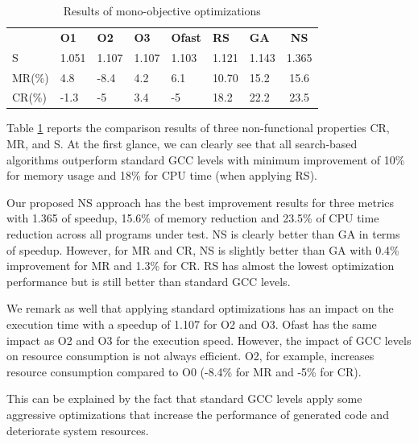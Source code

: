 \begin{table}[h]
	\centering
	\caption{Results of mono-objective optimizations}
	\label{my-label}
	\begin{tabular}{|l|l|l|l|l|l|l|c|}
		\hline
		& \textbf{O1}                    & \textbf{O2}                    & \textbf{O3}                    & \textbf{Ofast}                 & \textbf{RS}                    & \textbf{GA}                    & 
		\textbf{NS} \\
		\hhline{|=|=|=|=|=|=|=|=|}
		S  &  1.051 & 1.107  & 1.107  & 1.103  & 1.121  &  1.143 &  1.365  \\ \hline
		MR(\%) & 4.8  & -8.4  &  4.2 & 6.1  &  10.70 & 15.2  &  15.6  \\ \hline
		CR(\%) & -1.3  & -5  & 3.4  & -5  &  18.2 & 22.2  &  23.5  \\ \hline
	\end{tabular}
	\label{tab:Results of mono-objective optimizations}
\end{table}

Table \ref{tab:Results of mono-objective optimizations} reports the comparison results of three non-functional properties CR, MR, and S. At the first glance, we can clearly see that all search-based algorithms outperform standard GCC levels with minimum improvement of 10\% for memory usage and 18\% for CPU time (when applying RS).
 
Our proposed NS approach has the best improvement results for three metrics with 1.365 of speedup, 15.6\% of memory reduction and 23.5\% of CPU time reduction across all programs under test. NS is clearly better than GA in terms of speedup. However, for MR and CR, NS is slightly better than GA with 0.4\% improvement for MR and 1.3\% for CR. RS has almost the lowest optimization performance but is still better than standard GCC levels.

We remark as well that applying standard optimizations has an impact on the execution time with a speedup of 1.107 for O2 and O3. Ofast has the same impact as O2 and O3 for the execution speed. However, the impact of GCC levels on resource consumption is not always efficient. O2, for example, increases resource consumption compared to O0 (-8.4\% for MR and -5\% for CR). 

This can be explained by the fact that standard GCC levels apply some aggressive optimizations that increase the performance of generated code and deteriorate system resources.  

\noindent{}


